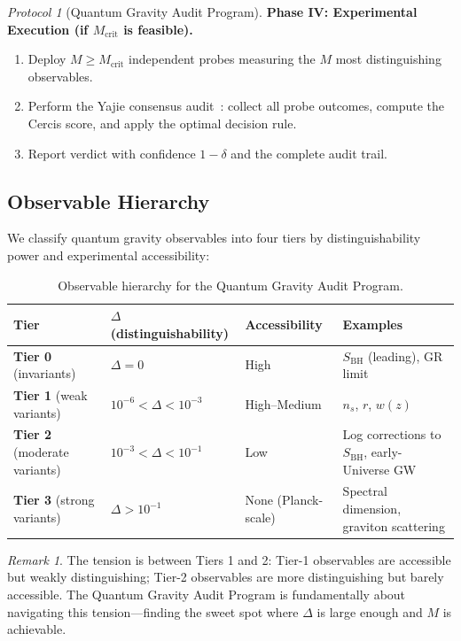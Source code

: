 \documentclass[12pt,a4paper]{article}
\theoremstyle{remark}
\newtheorem{remark}[theorem]{Remark}
\newtheorem{protocol}[theorem]{Protocol}
\newcommand{\Yajie}{\textsf{Yajie}}
\newcommand{\Cercis}{\textsf{Cercis}}
\begin{document}
\begin{protocol}[Quantum Gravity Audit Program]
\smallskip
\noindent\textbf{Phase IV: Experimental Execution (if $M_{\text{crit}}$ is feasible).}
\begin{enumerate}[leftmargin=*, label=\textbf{IV.\arabic*}]
  \item Deploy $M \geq M_{\text{crit}}$ independent probes measuring the $M$ most distinguishing observables.
  \item Perform the \Yajie{} consensus audit~\cite{scx_theory}: collect all probe outcomes, compute the \Cercis{} score, and apply the optimal decision rule.
  \item Report verdict with confidence $1-\delta$ and the complete audit trail.
\end{enumerate}
\end{protocol}

\subsection{Observable Hierarchy}

We classify quantum gravity observables into four tiers by distinguishability power and experimental accessibility:

\begin{table}[H]
\centering
\caption{Observable hierarchy for the Quantum Gravity Audit Program.}
\label{tab:obs_hierarchy}
\begin{tabular}{@{}lp{3cm}p{3cm}p{3cm}@{}}
\toprule
\textbf{Tier} & \textbf{$\Delta$ (distinguishability)} & \textbf{Accessibility} & \textbf{Examples} \\
\midrule
\textbf{Tier 0} (invariants) & $\Delta = 0$ & High & $S_{\text{BH}}$ (leading), GR limit \\
\textbf{Tier 1} (weak variants) & $10^{-6} < \Delta < 10^{-3}$ & High--Medium & $n_s$, $r$, $w(z)$ \\
\textbf{Tier 2} (moderate variants) & $10^{-3} < \Delta < 10^{-1}$ & Low & Log corrections to $S_{\text{BH}}$, early-Universe GW \\
\textbf{Tier 3} (strong variants) & $\Delta > 10^{-1}$ & None (Planck-scale) & Spectral dimension, graviton scattering \\
\bottomrule
\end{tabular}
\end{table}

\begin{remark}
\label{rem:tier_tension}
The tension is between Tiers 1 and 2: Tier-1 observables are accessible but weakly distinguishing; Tier-2 observables are more distinguishing but barely accessible. The Quantum Gravity Audit Program is fundamentally about navigating this tension---finding the sweet spot where $\Delta$ is large enough and $M$ is achievable.
\end{remark}
\end{document}
